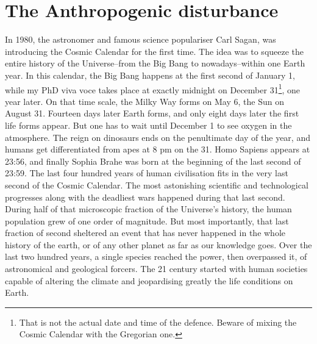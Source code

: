 

\section{The Anthropogenic disturbance}
\label{sec:anthropo_disturbance}

In 1980, the astronomer and famous science populariser Carl Sagan, was introducing the Cosmic Calendar for the first time. The idea was to squeeze the entire history of the Universe\---from the Big Bang to nowadays\---within one Earth year. 
In this calendar, the Big Bang happens at the first second of January 1, while my PhD viva voce takes place at exactly midnight on December 31\footnote{That is not the actual date and time of the defence. Beware of mixing the Cosmic Calendar with the Gregorian one.}, one year later.
On that time scale, the Milky Way forms on May 6, the Sun on August 31. Fourteen days later Earth forms, and only eight days later the first life forms appear. But one has to wait until December 1 to see oxygen in the atmosphere. The reign on dinosaurs ends on the penultimate day of the year, and humans get differentiated from apes at 8 pm on the 31. Homo Sapiens appears at 23:56, and finally Sophia Brahe was born at the beginning of the last second of 23:59.
The last four hundred years of human civilisation fits in the very last second of the Cosmic Calendar. The most astonishing scientific and technological progresses along with the deadliest wars happened during that last second. During half of that microscopic fraction of the Universe's history, the human population grew of one order of magnitude.
But most importantly, that last fraction of second sheltered an event that has never happened in the whole history of the earth, or of any other planet as far as our knowledge goes. Over the last two hundred years, a single species reached the power, then overpassed it, of astronomical and geological forcers. The 21 century started with human societies capable of altering the climate and jeopardising greatly the life conditions on Earth.

